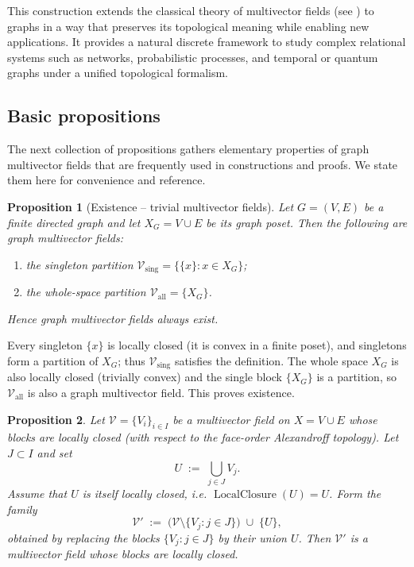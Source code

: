 \documentclass{article}
\theoremstyle{definition}
\theoremstyle{plain}
\newtheorem{proposition}{Proposition}
\theoremstyle{remark}
\newcommand{\1}{\mathbbm{1}}  %
\renewenvironment{proof}{{\bf Proof:\ }}{\qedsymbol}%
\begin{document}
This construction extends the classical theory of multivector fields (see \cite{dey2022tracking,Woukeng_2024,dey2019persistent}) to
graphs in a way that preserves its topological meaning while enabling
new applications.  It provides a natural discrete framework to study
complex relational systems such as networks, probabilistic processes,
and temporal or quantum graphs under a unified topological formalism.
\subsection{Basic propositions}

The next collection of propositions gathers elementary properties
of graph multivector fields that are frequently used in constructions
and proofs.  We state them here for convenience and reference.

\begin{proposition}[Existence -- trivial multivector fields]
\label{prop:existence}
Let \(G=(V,E)\) be a finite directed graph and let \(X_G=V\cup E\) be
its graph poset.  Then the following are graph multivector fields:
\begin{enumerate}
  \item the \emph{singleton partition} \(\mathcal{V}_{\mathrm{sing}}=\{\{x\} : x\in X_G\}\);
  \item the \emph{whole-space partition} \(\mathcal{V}_{\mathrm{all}}=\{X_G\}\).
\end{enumerate}
Hence graph multivector fields always exist.
\end{proposition}

\begin{proof}
Every singleton \(\{x\}\) is locally closed (it is convex in a finite
poset), and singletons form a partition of \(X_G\); thus
\(\mathcal{V}_{\mathrm{sing}}\) satisfies the definition.  The whole
space \(X_G\) is also locally closed (trivially convex) and the single
block \(\{X_G\}\) is a partition, so \(\mathcal{V}_{\mathrm{all}}\) is
also a graph multivector field.  This proves existence.
\end{proof}


 
\begin{proposition} 
\label{prop:coarsening-lc-fixed}
Let $\mathcal V=\{V_i\}_{i\in I}$ be a multivector field on
$X=V\cup E$ whose blocks are locally closed (with respect to the face-order
Alexandroff topology). Let $J\subset I$ and set
\[
U \;:=\; \bigcup_{j\in J} V_j.
\]
Assume that $U$ is itself locally closed, i.e. $\operatorname{LocalClosure}(U)=U$.
Form the family
\[
\mathcal V' \;:=\; \bigl(\mathcal V\setminus\{V_j:j\in J\}\bigr)\;\cup\;\{U\},
\]
obtained by replacing the blocks $\{V_j:j\in J\}$ by their union $U$.
Then $\mathcal V'$ is a multivector field whose blocks are locally closed.
\end{proposition}
\end{document}
